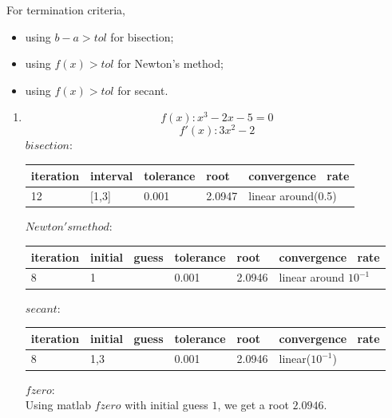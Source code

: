 \documentclass[11pt,twoside]{article}
\begin{document}
\begin{enumerate}[leftmargin=0pt]
	For termination criteria, 
	\begin{itemize}[label = {}]
		\item using $b-a > tol$ for bisection;
		\item using $f(x) > tol $ for Newton's method;
		\item using $f(x) > tol $ for secant.
	\end{itemize}
	\begin{enumerate}
	\item 	\[f(x): x^3 - 2x - 5 = 0\]
		  	\[f'(x): 3x^2 -2\]
		$bisection: $
		 \begin{longtable}{|>{\tiny}p{0.5in}|>{\tiny} p{0.5in}| >{\tiny}p{0.5in}|>{\tiny}p{0.5in}|	
		 	>{\tiny} p{0.8in}|}\hline
			iteration&interval&tolerance&root&convergence \ rate \\[0.1in]\hline
			12 &[1,3]&0.001&2.0947&linear around(0.5)\\[0.1in] \hline
		\end{longtable} 
		$Newton's method:$
		 \begin{longtable}{|>{\tiny}p{0.5in}|>{\tiny} p{0.5in}| >{\tiny}p{0.5in}|>{\tiny}p{0.5in}|	
		 	>{\tiny} p{0.8in}|}\hline
			iteration&initial \ guess&tolerance&root&convergence \ rate \\[0.1in]\hline
			8 &1&0.001&2.0946&linear around $10^{-1}$\\[0.1in] \hline
		\end{longtable} 
		$secant:$
		\begin{longtable}{|>{\tiny}p{0.5in}|>{\tiny} p{0.5in}| >{\tiny}p{0.5in}|>{\tiny}p{0.5in}|	
		 	>{\tiny} p{0.8in}|}\hline
			iteration&initial \ guess&tolerance&root&convergence \ rate \\[0.1in]\hline
			8 &1,3&0.001&2.0946& linear($10^{-1}$)\\[0.1in] \hline
		\end{longtable} 
		$fzero:$ \\
		Using matlab  $fzero$ with initial guess $1$, we get a root $2.0946$.


\end{enumerate}
\end{enumerate}
\end{document}
